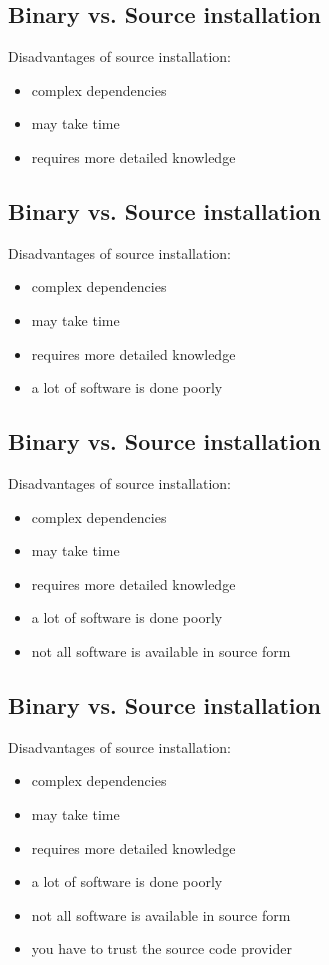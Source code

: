 \documentclass[xga]{xdvislides}
\begin{document}
\subsection{Binary vs. Source installation}
Disadvantages of source installation:
\begin{itemize}
	\item complex dependencies
	\item may take time
	\item requires more detailed knowledge
\end{itemize}

\subsection{Binary vs. Source installation}
Disadvantages of source installation:
\begin{itemize}
	\item complex dependencies
	\item may take time
	\item requires more detailed knowledge
	\item a lot of software is done poorly
\end{itemize}

\subsection{Binary vs. Source installation}
Disadvantages of source installation:
\begin{itemize}
	\item complex dependencies
	\item may take time
	\item requires more detailed knowledge
	\item a lot of software is done poorly
	\item not all software is available in source form
\end{itemize}

\subsection{Binary vs. Source installation}
Disadvantages of source installation:
\begin{itemize}
	\item complex dependencies
	\item may take time
	\item requires more detailed knowledge
	\item a lot of software is done poorly
	\item not all software is available in source form
	\item you have to trust the source code provider
\end{itemize}
\end{document}
